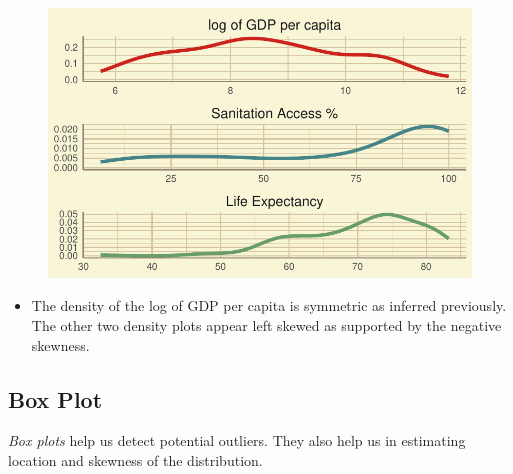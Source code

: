 \documentclass[
]{article}
\providecommand{\tightlist}{%
  \setlength{\itemsep}{0pt}\setlength{\parskip}{0pt}}\usepackage{longtable,booktabs,array}
\begin{document}
\begin{figure}[H]

{\centering \includegraphics{main_files/figure-pdf/unnamed-chunk-10-1.pdf}

}

\end{figure}

\begin{itemize}
\tightlist
\item
  The density of the log of GDP per capita is symmetric as inferred
  previously. The other two density plots appear left skewed as
  supported by the negative skewness.
\end{itemize}

\hypertarget{box-plot}{%
\subsection{Box Plot}\label{box-plot}}

\emph{Box plots} help us detect potential outliers. They also help us in
estimating location and skewness of the distribution.
\end{document}
